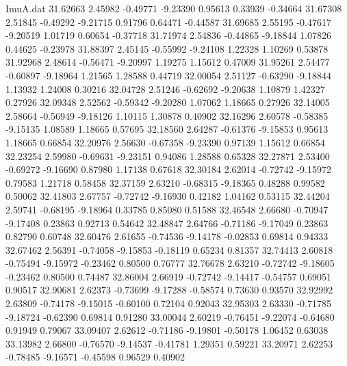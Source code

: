 \begin{filecontents}{ImuA.dat}
  31.62663    2.45982   -0.49771   -9.23390    0.95613    0.33939   -0.34664
  31.67308    2.51845   -0.49292   -9.21715    0.91796    0.64471   -0.44587
  31.69685    2.55195   -0.47617   -9.20519    1.01719    0.60654   -0.37718
  31.71974    2.54836   -0.44865   -9.18844    1.07826    0.44625   -0.23978
  31.88397    2.45145   -0.55992   -9.24108    1.22328    1.10269    0.53878
  31.92968    2.48614   -0.56471   -9.20997    1.19275    1.15612    0.47009
  31.95261    2.54477   -0.60897   -9.18964    1.21565    1.28588    0.44719
  32.00054    2.51127   -0.63290   -9.18844    1.13932    1.24008    0.30216
  32.04728    2.51246   -0.62692   -9.20638    1.10879    1.42327    0.27926
  32.09348    2.52562   -0.59342   -9.20280    1.07062    1.18665    0.27926
  32.14005    2.58664   -0.56949   -9.18126    1.10115    1.30878    0.40902
  32.16296    2.60578   -0.58385   -9.15135    1.08589    1.18665    0.57695
  32.18560    2.64287   -0.61376   -9.15853    0.95613    1.18665    0.66854
  32.20976    2.56630   -0.67358   -9.23390    0.97139    1.15612    0.66854
  32.23254    2.59980   -0.69631   -9.23151    0.94086    1.28588    0.65328
  32.27871    2.53400   -0.69272   -9.16690    0.87980    1.17138    0.67618
  32.30184    2.62014   -0.72742   -9.15972    0.79583    1.21718    0.58458
  32.37159    2.63210   -0.68315   -9.18365    0.48288    0.99582    0.50062
  32.41803    2.67757   -0.72742   -9.16930    0.42182    1.04162    0.53115
  32.44204    2.59741   -0.68195   -9.18964    0.33785    0.85080    0.51588
  32.46548    2.66680   -0.70947   -9.17408    0.23863    0.92713    0.54642
  32.48847    2.64766   -0.71186   -9.17049    0.23863    0.82790    0.60748
  32.60476    2.61655   -0.74536   -9.14178   -0.02853    0.69814    0.94333
  32.67462    2.56391   -0.74058   -9.15853   -0.18119    0.65234    0.81357
  32.74413    2.60818   -0.75494   -9.15972   -0.23462    0.80500    0.76777
  32.76678    2.63210   -0.72742   -9.18605   -0.23462    0.80500    0.74487
  32.86004    2.66919   -0.72742   -9.14417   -0.54757    0.69051    0.90517
  32.90681    2.62373   -0.73699   -9.17288   -0.58574    0.73630    0.93570
  32.92992    2.63809   -0.74178   -9.15015   -0.60100    0.72104    0.92043
  32.95303    2.63330   -0.71785   -9.18724   -0.62390    0.69814    0.91280
  33.00044    2.60219   -0.76451   -9.22074   -0.64680    0.91949    0.79067
  33.09407    2.62612   -0.71186   -9.19801   -0.50178    1.06452    0.63038
  33.13982    2.66800   -0.76570   -9.14537   -0.41781    1.29351    0.59221
  33.20971    2.62253   -0.78485   -9.16571   -0.45598    0.96529    0.40902

\end{filecontents}
